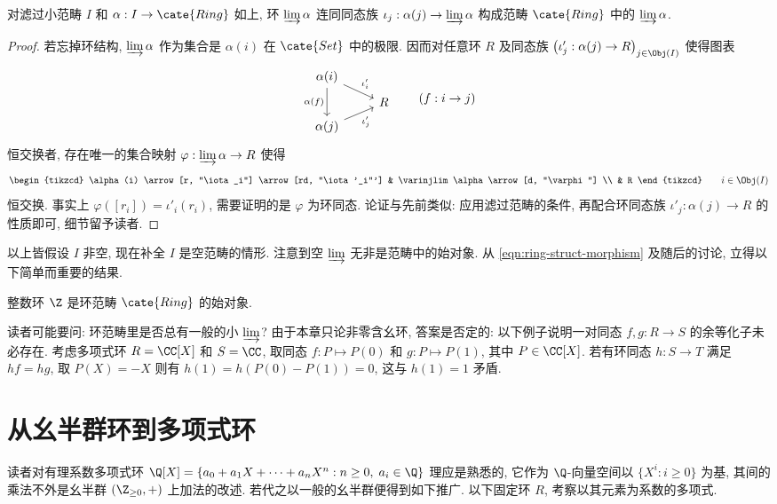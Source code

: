 \begin{proposition}\label{prop:ring-filtrant-limit}
	对滤过小范畴 $I$ 和 $\alpha: I \to \cate{Ring}$ 如上, 环 $\varinjlim \alpha$ 连同同态族 $\iota_j: \alpha(j) \to \varinjlim \alpha$ 构成范畴 $\cate{Ring}$ 中的 $\varinjlim \alpha$.
\end{proposition}
\begin{proof}
	若忘掉环结构, $\varinjlim \alpha$ 作为集合是 $\alpha(i)$ 在 $\cate{Set}$ 中的极限. 因而对任意环 $R$ 及同态族 $\left( \iota'_j: \alpha(j) \to R \right)_{j \in \Obj(I)}$ 使得图表
	\[ \begin{tikzcd}[row sep=tiny]
		\alpha(i) \arrow[dd, "\alpha(f)"'] \arrow[rd, "\iota'_i"] & \\
		& R \\
		\alpha(j) \arrow[ru, "\iota'_j"'] &
		\end{tikzcd} \qquad (f: i \to j) \]
	恒交换者, 存在唯一的集合映射 $\varphi: \varinjlim \alpha \to R$ 使得
	\[ \begin{tikzcd}
		\alpha(i) \arrow[r, "\iota_i"] \arrow[rd, "\iota'_i"'] & \varinjlim \alpha \arrow[d, "\varphi"] \\
		& R
	\end{tikzcd} \qquad i \in \Obj(I) \]
	恒交换. 事实上 $\varphi([r_i]) = \iota'_i(r_i)$, 需要证明的是 $\varphi$ 为环同态. 论证与先前类似: 应用滤过范畴的条件, 再配合环同态族 $\iota'_j: \alpha(j) \to R$ 的性质即可, 细节留予读者.
\end{proof}

以上皆假设 $I$ 非空, 现在补全 $I$ 是空范畴的情形. 注意到空 $\varinjlim$ 无非是范畴中的始对象. 从 \eqref{eqn:ring-struct-morphism} 及随后的讨论, 立得以下简单而重要的结果.
\begin{proposition}
	整数环 $\Z$ 是环范畴 $\cate{Ring}$ 的始对象.
\end{proposition}

读者可能要问: 环范畴里是否总有一般的小 $\varinjlim$? 由于本章只论非零含幺环, 答案是否定的: 以下例子说明一对同态 $f,g: R \to S$ 的余等化子未必存在. 考虑多项式环 $R = \CC[X]$ 和 $S = \CC$, 取同态 $f: P \mapsto P(0)$ 和 $g: P \mapsto P(1)$, 其中 $P \in \CC[X]$. 若有环同态 $h: S \to T$ 满足 $hf=hg$, 取 $P(X)=-X$ 则有 $h(1) = h(P(0)-P(1)) = 0$, 这与 $h(1)=1$ 矛盾.

\section{从幺半群环到多项式环}\label{sec:polynomial-ring}
读者对有理系数多项式环 $\Q[X] = \left\{ a_0 + a_1 X + \cdots + a_n X^n : n \geq 0, \; a_i \in \Q \right\}$ 理应是熟悉的, 它作为 $\Q$-向量空间以 $\{ X^i : i \geq 0 \}$ 为基, 其间的乘法不外是幺半群 $(\Z_{\geq 0}, +)$ 上加法的改述. 若代之以一般的幺半群便得到如下推广. 以下固定环 $R$, 考察以其元素为系数的多项式.

